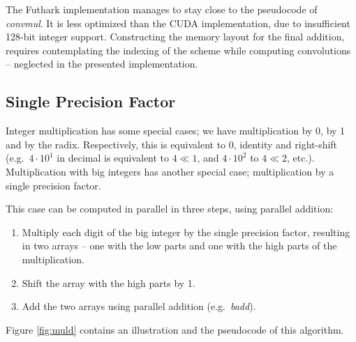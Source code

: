The Futhark implementation manages to stay close to the pseudocode of
\textit{convmul}. It is less optimized than the CUDA implementation, due to
insufficient 128-bit integer support. Constructing the memory layout for the
final addition, requires contemplating the indexing of the scheme while computing
convolutions -- neglected in the presented implementation.

\subsection{Single Precision Factor}
\label{subsec:mulsin}

Integer multiplication has some special cases; we have multiplication by 0, by 1
and by the radix. Respectively, this is equivalent to 0, identity and
right-shift (e.g.\ $4 \cdot 10^1$ in decimal is equivalent to $4 \ll 1$, and
$4\cdot 10^2$ to $4\ll 2$, etc.). Multiplication with big integers has another special
case; multiplication by a single precision factor.

This case can be computed in parallel in three steps, using parallel addition:
\begin{enumerate}[label=\Roman*]
\item Multiply each digit of the big integer by the single precision factor,
  resulting in two arrays -- one with the low parts and one with the high parts
  of the multiplication.
\item Shift the array with the high parts by 1.
\item Add the two arrays using parallel addition (e.g.\ \textit{badd}).
\end{enumerate}
Figure \ref{fig:muld} contains an illustration and the pseudocode of this
algorithm.

